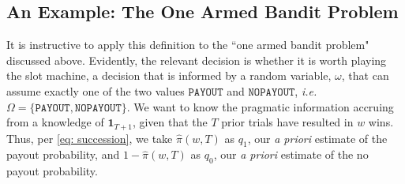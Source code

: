 \documentclass[11pt]{article}
\begin{document}
\subsection{An Example:  The One Armed Bandit Problem}
It is instructive to apply this definition to the ``one armed bandit problem" discussed above.  Evidently, the relevant decision is whether it is worth playing the slot machine, a decision that is informed by a random variable, $\omega$, that can assume 
exactly one of the two values $\mathtt{PAYOUT}$ and $\mathtt{NO PAYOUT}$, {\it i.e.} $\Omega = \{\mathtt{PAYOUT}, \mathtt{NO PAYOUT}\}$.  We want to know the pragmatic information accruing from a knowledge of $\mathbf 1_{T+1}$, given that the $T$ prior trials have resulted in $w$ wins.  Thus, per \eqref{eq: succession}, we take $\hat \pi(w, T)$ as $q_1$, our {\it a priori} estimate of the payout probability, and $1 - \hat \pi(w, T)$ as $q_0$, our {\it a priori} estimate of the no payout probability.\\  
\end{document}
